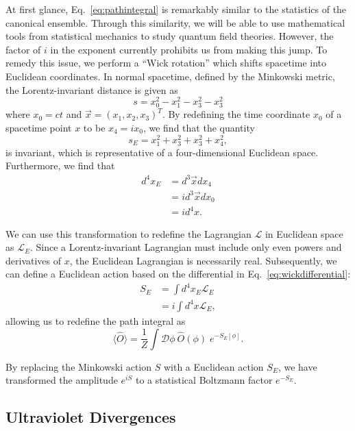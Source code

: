 \documentclass[12pt]{report}
\begin{document}
At first glance, Eq.~\ref{eq:pathintegral} is remarkably similar to the statistics of the canonical ensemble. Through this similarity, we will be able to use mathematical tools from statistical mechanics to study quantum field theories. However, the factor of $i$ in the exponent currently prohibits us from making this jump. To remedy this issue, we perform a ``Wick rotation'' which shifts spacetime into Euclidean coordinates. In normal spacetime, defined by the Minkowski metric, the Lorentz-invariant distance is given as
\begin{equation}
    s = x^2_0 - x^2_1- x^2_3- x^2_3
\end{equation}
where $x_0=ct$ and $\vec{x} = (x_1, x_2, x_3)^T$. By redefining the time coordinate $x_0$ of a spacetime point $x$ to be $x_4=ix_0$, we find that the quantity
\begin{equation}
    s_E = x^2_1+ x^2_3+ x^2_3 + x^2_4,
\end{equation}
is invariant, which is representative of a four-dimensional Euclidean space. Furthermore, we find that
\begin{align}
    d^4x_E &= d^3\vec{x}dx_4 \\
    &= i d^3\vec{x}dx_0 \\
    &= i d^4x. \label{eq:wickdifferential}
\end{align}

We can use this transformation to redefine the Lagrangian $\mathcal{L}$ in Euclidean space as $\mathcal{L}_E$. Since a Lorentz-invariant Lagrangian must include only even powers and derivatives of $x$, the Euclidean Lagrangian is necessarily real. Subsequently, we can define a Euclidean action based on the differential in Eq.~\ref{eq:wickdifferential}:
\begin{align}
    S_E &= \int d^4x_E \mathcal{L}_E \\
    &= i \int d^4x \mathcal{L}_E,
\end{align}
allowing us to redefine the path integral as 
\begin{equation}
    \label{eq:pathintegraleuclidean}
    \langle \hat O \rangle = \frac{1}{Z} \int \mathcal{D}\phi \: \hat O (\phi)\; e^{-S_E[\phi]}.
\end{equation}

By replacing the Minkowski action $S$ with a Euclidean action $S_E$, we have transformed the amplitude $e^{iS}$ to a statistical Boltzmann factor $e^{-S_E}$.

\subsection{Ultraviolet Divergences}
\end{document}
